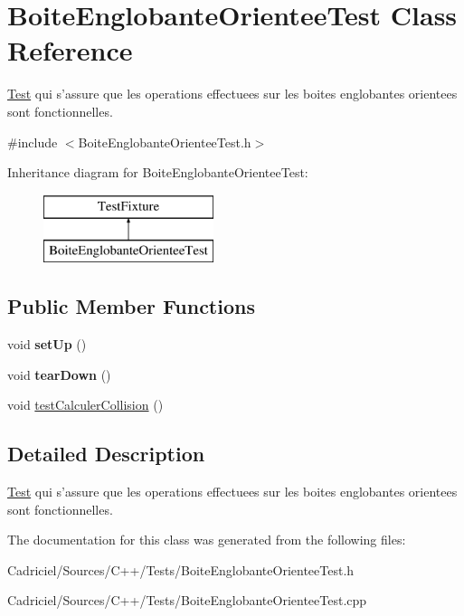 \hypertarget{class_boite_englobante_orientee_test}{\section{Boite\-Englobante\-Orientee\-Test Class Reference}
\label{class_boite_englobante_orientee_test}
}


\hyperlink{class_test}{Test} qui s'assure que les operations effectuees sur les boites englobantes orientees sont fonctionnelles.  




{\ttfamily \#include $<$Boite\-Englobante\-Orientee\-Test.\-h$>$}

Inheritance diagram for Boite\-Englobante\-Orientee\-Test\-:\begin{figure}[H]
\begin{center}
\leavevmode
\includegraphics[height=2.000000cm]{class_boite_englobante_orientee_test}
\end{center}
\end{figure}
\subsection*{Public Member Functions}
\begin{DoxyCompactItemize}
\item 
\hypertarget{group__inf2990_ga3834ff95e970fc8a6fa9dc257c29a389}{void {\bfseries set\-Up} ()}\label{group__inf2990_ga3834ff95e970fc8a6fa9dc257c29a389}

\item 
\hypertarget{group__inf2990_ga139b16d99327e493e0711b802b882832}{void {\bfseries tear\-Down} ()}\label{group__inf2990_ga139b16d99327e493e0711b802b882832}

\item 
void \hyperlink{group__inf2990_gaf90ec830d73ad669f126faf67f9139e8}{test\-Calculer\-Collision} ()
\end{DoxyCompactItemize}


\subsection{Detailed Description}
\hyperlink{class_test}{Test} qui s'assure que les operations effectuees sur les boites englobantes orientees sont fonctionnelles. 

The documentation for this class was generated from the following files\-:\begin{DoxyCompactItemize}
\item 
Cadriciel/\-Sources/\-C++/\-Tests/Boite\-Englobante\-Orientee\-Test.\-h\item 
Cadriciel/\-Sources/\-C++/\-Tests/Boite\-Englobante\-Orientee\-Test.\-cpp\end{DoxyCompactItemize}
